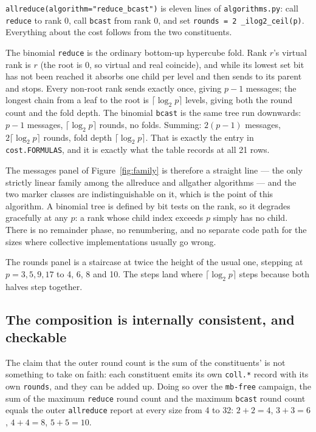 \documentclass[11pt]{article}
\begin{document}
\texttt{allreduce(algorithm="reduce\_bcast")} is eleven lines of \texttt{algorithms.py}: call
\texttt{reduce} to rank 0, call \texttt{bcast} from rank 0, and set
\texttt{rounds = 2\,\_ilog2\_ceil(p)}. Everything about the cost follows from the two
constituents.

The binomial \texttt{reduce} is the ordinary bottom-up hypercube fold. Rank $r$'s virtual rank is
$r$ (the root is 0, so virtual and real coincide), and while its lowest set bit has not been
reached it absorbs one child per level and then sends to its parent and stops. Every non-root
rank sends exactly once, giving $p-1$ messages; the longest chain from a leaf to the root is
$\lceil\log_2 p\rceil$ levels, giving both the round count and the fold depth. The binomial
\texttt{bcast} is the same tree run downwards: $p-1$ messages, $\lceil\log_2 p\rceil$ rounds, no
folds. Summing: $2(p-1)$ messages, $2\lceil\log_2 p\rceil$ rounds, fold depth
$\lceil\log_2 p\rceil$. That is exactly the entry in \texttt{cost.FORMULAS}, and it is exactly
what the table records at all 21 rows.

The messages panel of Figure~\ref{fig:family} is therefore a straight line --- the only strictly
linear family among the allreduce and allgather algorithms --- and the two marker classes are
indistinguishable on it, which is the point of this algorithm. A binomial tree is defined by bit
tests on the rank, so it degrades gracefully at any $p$: a rank whose child index exceeds $p$
simply has no child. There is no remainder phase, no renumbering, and no separate code path for
the sizes where collective implementations usually go wrong.

The rounds panel is a staircase at twice the height of the usual one, stepping at
$p = 3, 5, 9, 17$ to 4, 6, 8 and 10. The steps land where $\lceil\log_2 p\rceil$ steps because
both halves step together.

\subsection{The composition is internally consistent, and checkable}

The claim that the outer round count is the sum of the constituents' is not something to take on
faith: each constituent emits its own \texttt{coll.*} record with its own \texttt{rounds}, and
they can be added up. Doing so over the \texttt{mb-free} campaign, the sum of the maximum
\texttt{reduce} round count and the maximum \texttt{bcast} round count equals the outer
\texttt{allreduce} report at every size from 4 to 32: $2+2=4$, $3+3=6$, $4+4=8$, $5+5=10$.
\end{document}
